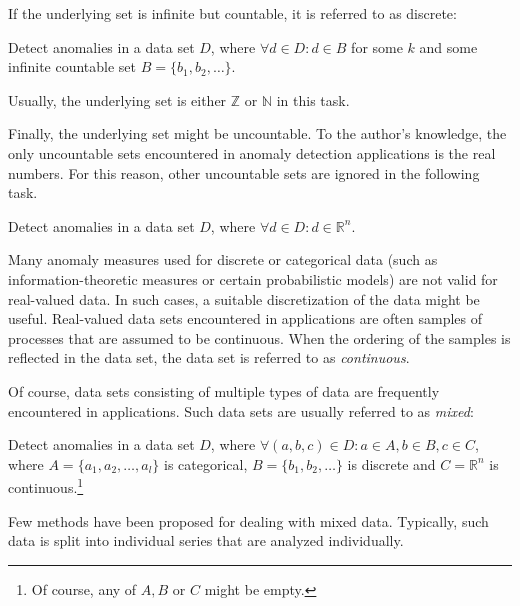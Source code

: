 If the underlying set is infinite but countable, it is referred to as discrete:
 
\begin{task}
  Detect anomalies in a data set $D$, where $\forall d \in D: d \in B$ for some $k$ and some infinite countable set $B = \{b_1, b_2, \dots\}$.
\end{task}

Usually, the underlying set is either $\mathbb{Z}$ or $\mathbb{N}$ in this task.

Finally, the underlying set might be uncountable. To the author's knowledge, the only uncountable sets encountered in anomaly detection applications is the real numbers. For this reason, other uncountable sets are ignored in the following task.

\begin{task}
  Detect anomalies in a data set $D$, where $\forall d \in D: d \in \mathbb{R}^n$.
\end{task}

Many anomaly measures used for discrete or categorical data (such as information-theoretic measures or certain probabilistic models) are not valid for real-valued data. In such cases, a suitable discretization of the data might be useful. Real-valued data sets encountered in applications are often samples of processes that are assumed to be continuous. When the ordering of the samples is reflected in the data set, the data set is referred to as \emph{continuous}.

Of course, data sets consisting of multiple types of data are frequently encountered in applications. Such data sets are usually referred to as \emph{mixed}:
\begin{task}
  Detect anomalies in a data set $D$, where $\forall (a, b, c) \in D: a \in A, b \in B, c \in C$, where $A = \{a_1, a_2, \dots, a_l\}$ is categorical, $B = \{b_1, b_2, \dots\}$ is discrete and $C = \mathbb{R}^n$ is continuous.\footnote{Of course, any of $A, B$ or $C$ might be empty.}
\end{task}

Few methods have been proposed for dealing with mixed data. Typically, such data is split into individual series that are analyzed individually.

